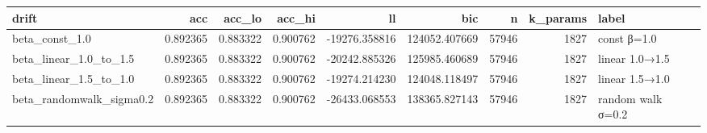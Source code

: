 \begin{tabular}{lrrrrrrrl}
\toprule
drift & acc & acc\_lo & acc\_hi & ll & bic & n & k\_params & label \\
\midrule
beta\_const\_1.0 & 0.892365 & 0.883322 & 0.900762 & -19276.358816 & 124052.407669 & 57946 & 1827 & const β=1.0 \\
beta\_linear\_1.0\_to\_1.5 & 0.892365 & 0.883322 & 0.900762 & -20242.885326 & 125985.460689 & 57946 & 1827 & linear 1.0→1.5 \\
beta\_linear\_1.5\_to\_1.0 & 0.892365 & 0.883322 & 0.900762 & -19274.214230 & 124048.118497 & 57946 & 1827 & linear 1.5→1.0 \\
beta\_randomwalk\_sigma0.2 & 0.892365 & 0.883322 & 0.900762 & -26433.068553 & 138365.827143 & 57946 & 1827 & random walk σ=0.2 \\
\bottomrule
\end{tabular}
